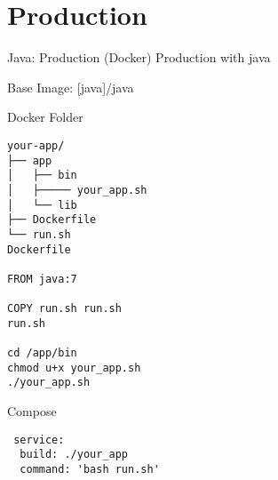 \chapter{Production}

Java: Production (Docker)
Production with java

Base Image: [java]/java

Docker Folder

\begin{lstlisting}
your-app/
├── app
│   ├── bin
│   ├───── your_app.sh
│   └── lib
├── Dockerfile
└── run.sh
Dockerfile

FROM java:7

COPY run.sh run.sh
run.sh

cd /app/bin
chmod u+x your_app.sh
./your_app.sh
\end{lstlisting}

Compose

\begin{lstlisting}
 service:
  build: ./your_app
  command: 'bash run.sh'
\end{lstlisting}
